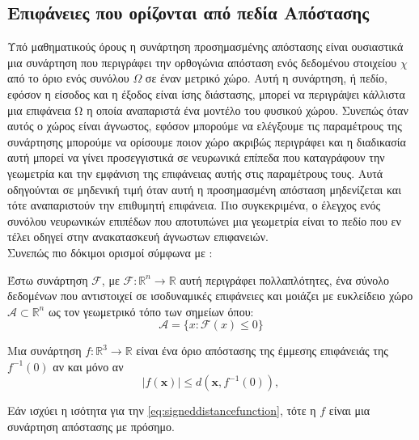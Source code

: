 \subsection{Επιφάνειες που ορίζονται από πεδία Απόστασης}
    Υπό μαθηματικούς όρους η συνάρτηση προσημασμένης απόστασης είναι ουσιαστικά μια συνάρτηση που περιγράφει την ορθογώνια απόσταση ενός δεδομένου στοιχείου \(\chi\) από το όριο ενός συνόλου \(\Omega\) σε έναν μετρικό χώρο. Αυτή η συνάρτηση, ή πεδίο, εφόσον η είσοδος και η έξοδος είναι ίσης διάστασης, μπορεί να περιγράψει κάλλιστα μια επιφάνεια Ω η οποία αναπαριστά ένα μοντέλο του φυσικού χώρου. Συνεπώς όταν αυτός ο χώρος είναι άγνωστος, εφόσον μπορούμε να ελέγξουμε τις παραμέτρους της συνάρτησης μπορούμε να ορίσουμε ποιον χώρο ακριβώς περιγράφει και η διαδικασία αυτή μπορεί να γίνει προσεγγιστικά σε νευρωνικά επίπεδα που καταγράφουν την γεωμετρία και την εμφάνιση της επιφάνειας αυτής στις παραμέτρους τους. Αυτά οδηγούνται σε μηδενική τιμή όταν αυτή η προσημασμένη απόσταση μηδενίζεται και τότε αναπαριστούν την επιθυμητή επιφάνεια. Πιο συγκεκριμένα, ο έλεγχος ενός συνόλου νευρωνικών επιπέδων που αποτυπώνει μια γεωμετρία είναι το πεδίο που εν τέλει οδηγεί στην ανακατασκευή άγνωστων επιφανειών. \\
    Συνεπώς πιο δόκιμοι ορισμοί σύμφωνα με \cite{JohnHartSphereTracing}: 
    \begin{definition}[Manifold]
        Έστω συνάρτηση \(\mathcal{F}\), με \(\mathcal{F}:\mathbb{R}^{n} \rightarrow \mathbb{R}\)  αυτή περιγράφει πολλαπλότητες, ένα σύνολο δεδομένων που αντιστοιχεί σε ισοδυναμικές επιφάνειες και μοιάζει με ευκλείδειο χώρο \(\mathcal{A}\subset{\mathbb{R}^{n}}\) ως τον γεωμετρικό τόπο των σημείων όπου: 
        \[
        \mathcal{A} = \{x : \mathcal{F}(x) \leq 0 \}
        \]
    \end{definition}

    \begin{definition}
     Μια συνάρτηση $f: \mathbb{R}^3 \rightarrow \mathbb{R}$ είναι ένα όριο απόστασης της έμμεσης επιφάνειάς της $f^{-1}(0)$ αν και μόνο αν
    \begin{equation}
        |f(\boldsymbol{x})| \leq d\left(\boldsymbol{x}, f^{-1}(0)\right),
        \label{eq:signeddistancefunction}
    \end{equation}
    
    Εάν ισχύει η ισότητα για την \ref{eq:signeddistancefunction}, τότε η $f$ είναι μια συνάρτηση απόστασης με πρόσημο. \cite{JohnHartSphereTracing}
    \end{definition}

